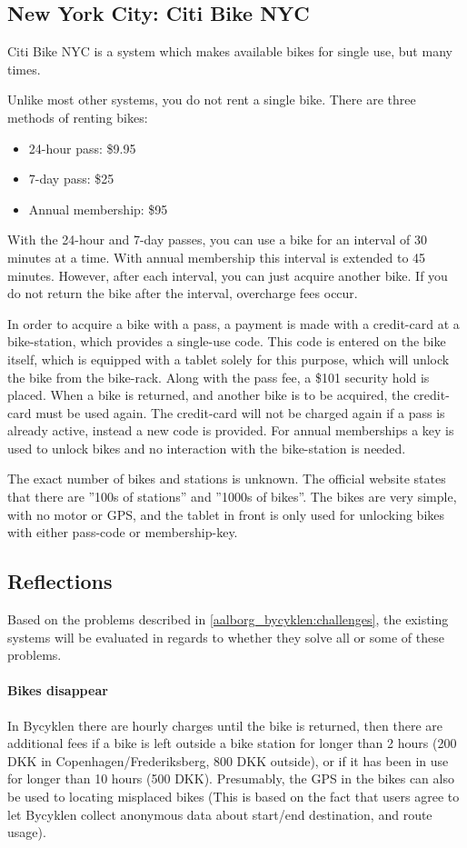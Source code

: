 \subsection{New York City: Citi Bike NYC}
Citi Bike NYC\cite{nyc_citibike} is a system which makes available bikes for single use, but many times.

Unlike most other systems, you do not rent a single bike.
There are three methods of renting bikes:

\begin{itemize}
\item 24-hour pass: \$9.95
\item 7-day pass: \$25
\item Annual membership: \$95
\end{itemize}

With the 24-hour and 7-day passes, you can use a bike for an interval of 30 minutes at a time.
With annual membership this interval is extended to 45 minutes.
However, after each interval, you can just acquire another bike.
If you do not return the bike after the interval, overcharge fees occur.

In order to acquire a bike with a pass, a payment is made with a credit-card at a bike-station, which provides a single-use code.
This code is entered on the bike itself, which is equipped with a tablet solely for this purpose, which will unlock the bike from the bike-rack.
Along with the pass fee, a \$101 security hold is placed.
When a bike is returned, and another bike is to be acquired, the credit-card must be used again.
The credit-card will not be charged again if a pass is already active, instead a new code is provided.
For annual memberships a key is used to unlock bikes and no interaction with the bike-station is needed.

The exact number of bikes and stations is unknown.
The official website states that there are ''100s of stations'' and ''1000s of bikes''.
The bikes are very simple, with no motor or GPS, and the tablet in front is only used for unlocking bikes with either pass-code or membership-key.

\subsection{Reflections}
Based on the problems described in \cref{aalborg_bycyklen:challenges}, the existing systems will be evaluated in regards to whether they solve all or some of these problems.

\paragraph{Bikes disappear}
In Bycyklen there are hourly charges until the bike is returned, then there are additional fees if a bike is left outside a bike station for longer than 2 hours (200 DKK in Copenhagen/Frederiksberg, 800 DKK outside), or if it has been in use for longer than 10 hours (500 DKK).
Presumably, the GPS in the bikes can also be used to locating misplaced bikes (This is based on the fact that users agree to let Bycyklen collect anonymous data about start/end destination, and route usage).

